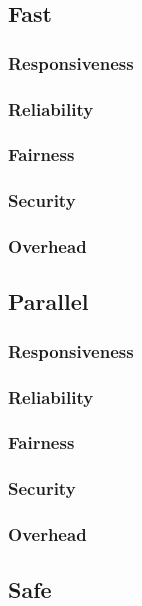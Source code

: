             \subsection{Fast}
                \subsubsection{Responsiveness}
                \subsubsection{Reliability}
                \subsubsection{Fairness}
                \subsubsection{Security}
                \subsubsection{Overhead}
            \subsection{Parallel}
                \subsubsection{Responsiveness}
                \subsubsection{Reliability}
                \subsubsection{Fairness}
                \subsubsection{Security}
                \subsubsection{Overhead}
            \subsection{Safe}
